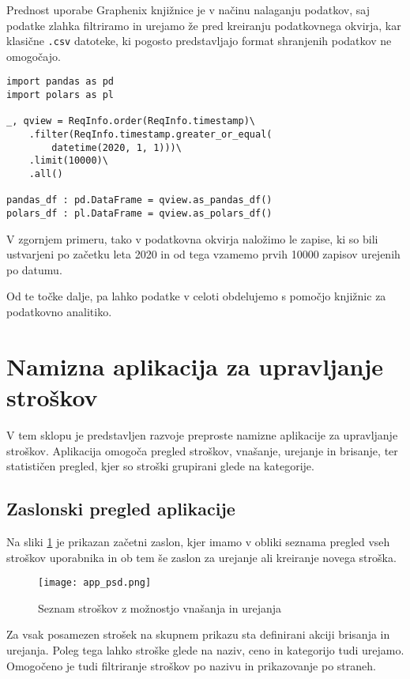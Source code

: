 \documentclass[a4paper,12pt,openright]{book}
\begin{document}
    Prednost uporabe Graphenix knjižnice je v načinu nalaganju podatkov, saj podatke zlahka filtriramo in urejamo že pred kreiranju podatkovnega okvirja, kar klasične {\tt .csv} datoteke, ki pogosto predstavljajo format shranjenih podatkov ne omogočajo.

\begin{verbatim}
import pandas as pd
import polars as pl

_, qview = ReqInfo.order(ReqInfo.timestamp)\
    .filter(ReqInfo.timestamp.greater_or_equal(
        datetime(2020, 1, 1)))\
    .limit(10000)\
    .all()

pandas_df : pd.DataFrame = qview.as_pandas_df()
polars_df : pl.DataFrame = qview.as_polars_df()
\end{verbatim}

    \noindent
    V zgornjem primeru, tako v podatkovna okvirja naložimo le zapise, ki so bili ustvarjeni po začetku leta 2020 in od tega vzamemo prvih \num{10000} zapisov urejenih po datumu.

    Od te točke dalje, pa lahko podatke v celoti obdelujemo s pomočjo knjižnic za podatkovno analitiko.

    \section{Namizna aplikacija za upravljanje stroškov}

    V tem sklopu je predstavljen razvoje preproste namizne aplikacije za upravljanje stroškov. Aplikacija omogoča pregled stroškov, vnašanje, urejanje in brisanje, ter statističen pregled, kjer so stroški grupirani glede na kategorije.

    \subsection{Zaslonski pregled aplikacije}
    Na sliki \ref{home_screen} je prikazan začetni zaslon, kjer imamo v obliki seznama pregled vseh stroškov uporabnika in ob tem še zaslon za urejanje ali kreiranje novega stroška. 
    
    \begin{figure}[H]
        \centerline{\texttt{[image: app\_psd.png]}}
        \caption{Seznam stroškov z možnostjo vnašanja in urejanja}
        \label{home_screen}
    \end{figure}

    \noindent
    Za vsak posamezen strošek na skupnem prikazu sta definirani akciji brisanja in urejanja. Poleg tega lahko stroške glede na naziv, ceno in kategorijo tudi urejamo. Omogočeno je tudi filtriranje stroškov po nazivu in prikazovanje po straneh.
\end{document}
